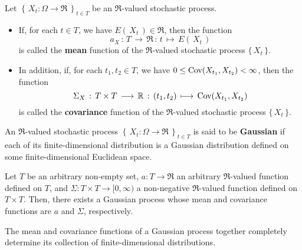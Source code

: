 \begin{definition}
\mbox{}\vskip 0.1cm
\noindent
Let $\left\{\,X_{t}:\Omega\longrightarrow\Re\,\right\}_{t \in T}$ be an
$\Re$-valued stochastic process.
\begin{itemize}
\item If, for each $t \in T$, we have $E\!\left(\,X_{t}\,\right) \in \Re$, then the function
\begin{equation*}
a_{X} \,:\, T \, \longrightarrow \, \Re \, : \, t \, \longmapsto \, E\!\left(\,X_{t}\,\right)
\end{equation*}
is called the \textbf{mean} function of the $\Re$-valued stochastic process $\{\,X_{t}\,\}$.
\item In addition, if, for each $t_{1},t_{2} \in T$, we have $0 \leq \textnormal{Cov}\!\left(X_{t_{1}},X_{t_{2}}\right) < \infty$,
then the function
\begin{equation*}
\Sigma_{X} \,:\, T \times T \, \longrightarrow \, \mathbb{R} \, : \, (t_{1},t_{2}) \, \longmapsto \, \textnormal{Cov}\!\left(X_{t_{1}},X_{t_{2}}\right)
\end{equation*}
is called the \textbf{covariance} function of the $\Re$-valued stochastic process $\{\,X_{t}\,\}$.
\end{itemize}
\end{definition}

\begin{definition}
\mbox{}\vskip 0cm
\noindent
An $\Re$-valued stochastic process
$\left\{\,X_{t}:\Omega\longrightarrow\Re\,\right\}_{t \in T}$
is said to be \textbf{Gaussian} if each of its finite-dimensional distribution is a
Gaussian distribution defined on some finite-dimensional Euclidean space.
\end{definition}

\begin{theorem}
\mbox{}\vskip 0cm
\noindent
Let $T$ be an arbitrary non-empty set, $a : T \longrightarrow \Re$ an arbitrary $\Re$-valued function
defined on $T$, and $\Sigma : T \times T \longrightarrow [0,\infty)$ a non-negative $\Re$-valued function
defined on $T \times T$. Then, there exists a Gaussian process whose mean and covariance functions
are $a$ and $\Sigma$, respectively. 
\end{theorem}

\begin{theorem}
\mbox{}\vskip 0cm
\noindent
The mean and covariance functions of a Gaussian process together completely determine
its collection of finite-dimensional distributions.
\end{theorem}

